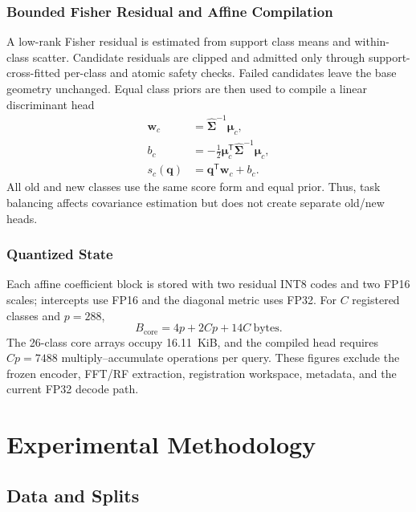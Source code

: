 \documentclass[journal]{IEEEtran}
\begin{document}
\subsubsection{Bounded Fisher Residual and Affine Compilation}

A low-rank Fisher residual \cite{fisher1936lda} is estimated from support class means and within-class scatter. Candidate residuals are clipped and admitted only through support-cross-fitted per-class and atomic safety checks. Failed candidates leave the base geometry unchanged. Equal class priors are then used to compile a linear discriminant head
\begin{align}
\mathbf{w}_c &=
\widehat{\boldsymbol{\Sigma}}^{-1}\boldsymbol{\mu}_c,\\
b_c &=
-\frac{1}{2}
\boldsymbol{\mu}_c^{\mathsf T}
\widehat{\boldsymbol{\Sigma}}^{-1}\boldsymbol{\mu}_c,\\
s_c(\mathbf{q}) &= \mathbf{q}^{\mathsf T}\mathbf{w}_c+b_c.
\label{eq:lda}
\end{align}
All old and new classes use the same score form and equal prior. Thus, task balancing affects covariance estimation but does not create separate old/new heads.

\subsubsection{Quantized State}

Each affine coefficient block is stored with two residual INT8 codes and two FP16 scales; intercepts use FP16 and the diagonal metric uses FP32. For \(C\) registered classes and \(p=288\),
\begin{equation}
B_{\mathrm{core}} = 4p+2Cp+14C\ \text{bytes}.
\end{equation}
The 26-class core arrays occupy 16.11~KiB, and the compiled head requires \(Cp=7488\) multiply--accumulate operations per query. These figures exclude the frozen encoder, FFT/RF extraction, registration workspace, metadata, and the current FP32 decode path.

\section{Experimental Methodology}

\subsection{Data and Splits}
\end{document}
